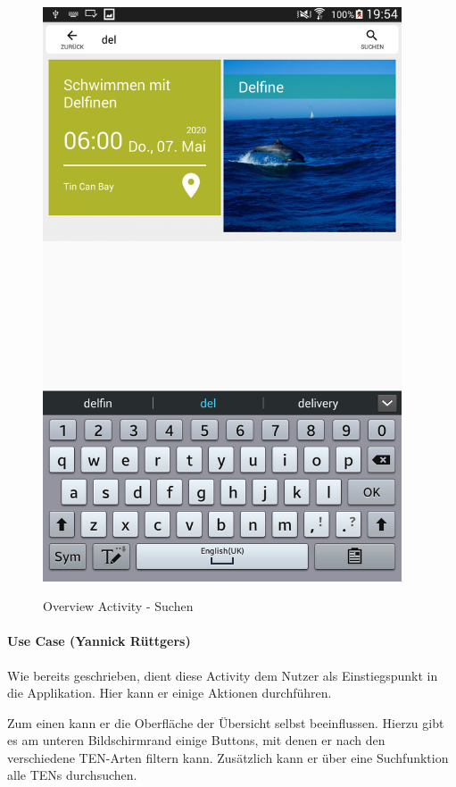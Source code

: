 \begin{figure}[H]
\centering
\begin{minipage}[t]{1\textwidth} %
\caption{Overview Activity - Suchen} %
\includegraphics[height=17cm]{img/Suchen}\\ %
\end{minipage}
\end{figure}

\paragraph{Use Case (Yannick Rüttgers)}
Wie bereits geschrieben, dient diese Activity dem Nutzer als Einstiegspunkt in die Applikation. Hier kann er einige Aktionen durchführen.
 
Zum einen kann er die Oberfläche der Übersicht selbst beeinflussen. Hierzu gibt es am unteren Bildschirmrand einige Buttons, mit denen er nach den verschiedene TEN-Arten filtern kann. Zusätzlich kann er über eine Suchfunktion alle TENs durchsuchen.

